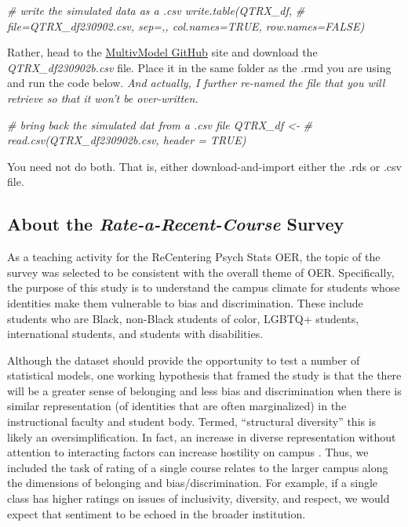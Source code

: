 \documentclass[
  11pt,
]{book}
\newenvironment{Shaded}{\begin{snugshade}}{\end{snugshade}}
\newcommand{\CommentTok}[1]{\textcolor[rgb]{0.37,0.37,0.37}{\textit{#1}}}
\begin{document}
\begin{Shaded}
\begin{Highlighting}[]
\CommentTok{\# write the simulated data as a .csv write.table(QTRX\_df,}
\CommentTok{\# file=\textquotesingle{}QTRX\_df230902.csv\textquotesingle{}, sep=\textquotesingle{},\textquotesingle{}, col.names=TRUE, row.names=FALSE)}
\end{Highlighting}
\end{Shaded}

Rather, head to the \href{https://github.com/lhbikos/ReC_MultivModel}{MultivModel GitHub} site and download the \emph{QTRX\_df230902b.csv} file. Place it in the same folder as the .rmd you are using and run the code below. \emph{And actually, I further re-named the file that you will retrieve so that it won't be over-written.}

\begin{Shaded}
\begin{Highlighting}[]
\CommentTok{\# bring back the simulated dat from a .csv file QTRX\_df \textless{}{-}}
\CommentTok{\# read.csv(\textquotesingle{}QTRX\_df230902b.csv\textquotesingle{}, header = TRUE)}
\end{Highlighting}
\end{Shaded}

You need not do both. That is, either download-and-import either the .rds or .csv file.

\hypertarget{about-the-rate-a-recent-course-survey}{%
\subsection{\texorpdfstring{About the \emph{Rate-a-Recent-Course} Survey}{About the Rate-a-Recent-Course Survey}}\label{about-the-rate-a-recent-course-survey}}

As a teaching activity for the ReCentering Psych Stats OER, the topic of the survey was selected to be consistent with the overall theme of OER. Specifically, the purpose of this study is to understand the campus climate for students whose identities make them vulnerable to bias and discrimination. These include students who are Black, non-Black students of color, LGBTQ+ students, international students, and students with disabilities.

Although the dataset should provide the opportunity to test a number of statistical models, one working hypothesis that framed the study is that the there will be a greater sense of belonging and less bias and discrimination when there is similar representation (of identities that are often marginalized) in the instructional faculty and student body. Termed, ``structural diversity'' \citep{lewis_black_2019} this is likely an oversimplification. In fact, an increase in diverse representation without attention to interacting factors can increase hostility on campus \citep{hurtado_linking_2007}. Thus, we included the task of rating of a single course relates to the larger campus along the dimensions of belonging and bias/discrimination. For example, if a single class has higher ratings on issues of inclusivity, diversity, and respect, we would expect that sentiment to be echoed in the broader institution.
\end{document}
